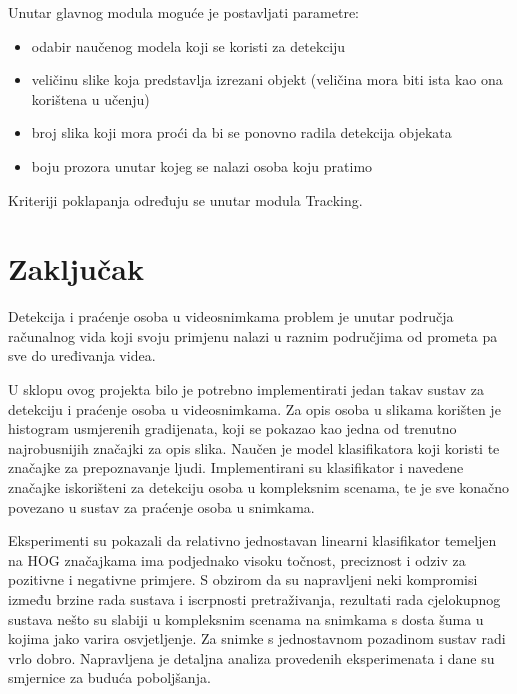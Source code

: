 \documentclass[utf8, seminar, numeric, times]{fer}
\begin{document}
Unutar glavnog modula moguće je postavljati parametre:
\begin{itemize}
	\item odabir naučenog modela koji se koristi za detekciju
	\item veličinu slike koja predstavlja izrezani objekt (veličina mora biti ista kao ona korištena u učenju)
	\item broj slika koji mora proći da bi se ponovno radila detekcija objekata
	\item boju prozora unutar kojeg se nalazi osoba koju pratimo
\end{itemize}

Kriteriji poklapanja određuju se unutar modula Tracking.


\chapter{Zaključak}
Detekcija i praćenje osoba u videosnimkama problem je unutar područja računalnog vida koji svoju primjenu nalazi u raznim područjima od prometa pa sve do uređivanja videa.

U sklopu ovog projekta bilo je potrebno implementirati jedan takav sustav za detekciju i praćenje osoba u videosnimkama. Za opis osoba u slikama korišten je histogram usmjerenih gradijenata, koji se pokazao kao jedna od trenutno najrobusnijih značajki za opis slika. Naučen je model klasifikatora koji koristi te značajke za prepoznavanje ljudi. Implementirani su klasifikator i navedene značajke iskorišteni za detekciju osoba u kompleksnim scenama, te je sve konačno povezano u sustav za praćenje osoba u snimkama.

Eksperimenti su pokazali da relativno jednostavan linearni klasifikator temeljen na HOG značajkama ima  podjednako visoku točnost, preciznost i odziv za pozitivne i negativne primjere. S obzirom da su napravljeni neki kompromisi između brzine rada sustava i iscrpnosti pretraživanja, rezultati rada cjelokupnog sustava nešto su slabiji u kompleksnim scenama na snimkama s dosta šuma u kojima jako varira osvjetljenje. Za snimke s jednostavnom pozadinom sustav radi vrlo dobro. Napravljena je detaljna analiza provedenih eksperimenata i dane su smjernice za buduća poboljšanja.



\end{document}
